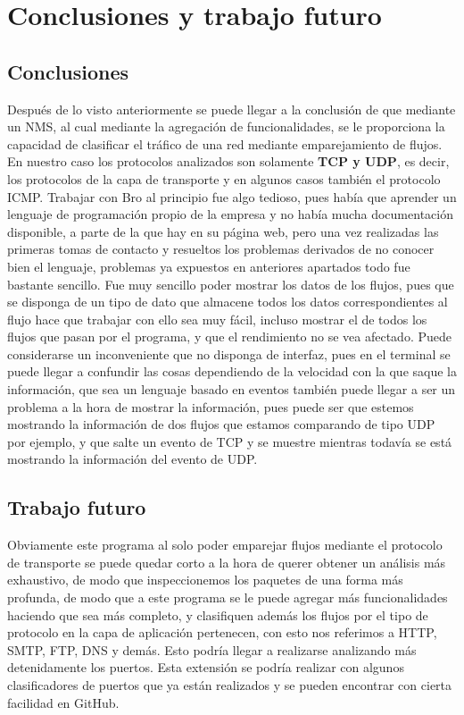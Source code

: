 \chapter{Conclusiones y trabajo futuro}

\section{Conclusiones}

Después de lo visto anteriormente se puede llegar a 
la conclusión de que mediante un NMS, al cual mediante 
la agregación de funcionalidades, se le proporciona la 
capacidad de clasificar el tráfico de una red mediante 
emparejamiento de flujos. En nuestro caso los protocolos 
analizados son solamente \textbf{TCP y UDP}, es decir, 
los protocolos de la capa de transporte y en algunos casos 
también el protocolo ICMP.
\intro
Trabajar con Bro al principio fue algo tedioso, pues 
había que aprender un lenguaje de programación propio de la empresa 
y no había mucha documentación disponible, a parte de 
la que hay en su página web, pero una vez realizadas 
las primeras tomas de contacto y resueltos los problemas 
derivados de no conocer bien el lenguaje, problemas ya expuestos 
en anteriores apartados todo fue bastante sencillo.
\intro
Fue muy sencillo poder mostrar los datos de los flujos, 
pues que se disponga de un tipo de dato que almacene todos 
los datos correspondientes al flujo hace que trabajar con 
ello sea muy fácil, incluso mostrar el de todos los 
flujos que pasan por el programa, y que el rendimiento 
no se vea afectado. Puede considerarse un inconveniente 
que no disponga de interfaz, pues en el terminal se puede 
llegar a confundir las cosas dependiendo de la velocidad 
con la que saque la información, que sea un lenguaje basado 
en eventos también puede llegar a ser un problema a la hora 
de mostrar la información, pues puede ser que estemos 
mostrando la información de dos flujos que estamos comparando 
de tipo UDP por ejemplo, y que salte un evento de TCP y 
se muestre mientras todavía se está mostrando la información 
del evento de UDP.

\section{Trabajo futuro}

Obviamente este programa al solo poder emparejar flujos 
mediante el protocolo de transporte se puede quedar corto 
a la hora de querer obtener un análisis más exhaustivo, de 
modo que inspeccionemos los paquetes de una forma más profunda, 
de modo que a este programa se le puede agregar más funcionalidades 
haciendo que sea más completo, y clasifiquen además los flujos 
por el tipo de protocolo en la capa de aplicación pertenecen, 
con esto nos referimos a HTTP, SMTP, FTP, DNS y demás. Esto 
podría llegar a realizarse analizando más detenidamente los puertos. 
Esta extensión se podría realizar con algunos clasificadores de puertos 
que ya están realizados y se pueden encontrar con cierta facilidad en 
GitHub.
